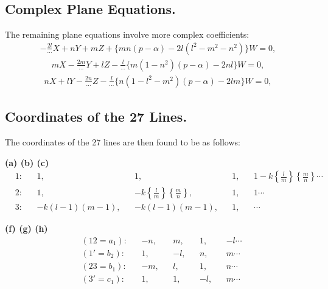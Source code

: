 \documentclass[11pt,a4paper]{article}
\begin{document}
\subsection*{Complex Plane Equations.}

The remaining plane equations involve more complex coefficients:
\begin{multline*}
-\frac{2l}{\cdots}X + nY + mZ + \{mn(p-\alpha) - 2l(l^2 - m^2 - n^2)\}W = 0,
\end{multline*}
\begin{equation*}
[36' = p_1]
\end{equation*}
\begin{multline*}
mX - \frac{2m}{\cdots}Y + lZ - \frac{l}{\cdots}\{m(1-n^2)(p-\alpha) - 2nl\}W = 0,
\end{multline*}
\begin{equation*}
[25' = q_1]
\end{equation*}
\begin{multline*}
nX + lY - \frac{2n}{\cdots}Z - \frac{l}{\cdots}\{n(1-l^2-m^2)(p-\alpha) - 2lm\}W = 0,
\end{multline*}
\begin{equation*}
[13.26.45 = r_1]
\end{equation*}

\subsection*{Coordinates of the 27 Lines.}

The coordinates of the 27 lines are then found to be as follows:

\textbf{(a) (b) (c)}
\begin{align*}
&1: && 1, && 1, && 1, && 1 - k\left\{\frac{l}{m}\right\}\left\{\frac{m}{n}\right\} \cdots \\
&2: && 1, && -k\left\{\frac{l}{m}\right\}\left\{\frac{m}{n}\right\}, && 1, && 1 \cdots \\
&3: && -k(l-1)(m-1), && -k(l-1)(m-1), && 1, && \cdots
\end{align*}

\textbf{(f) (g) (h)}
\begin{align*}
&(12 = a_1): && -n, && m, && 1, && -l \cdots \\
&(1' = b_2): && 1, && -l, && n, && m \cdots \\
&(23 = b_1): && -m, && l, && 1, && n \cdots \\
&(3' = c_1): && 1, && 1, && -l, && m \cdots
\end{align*}
\end{document}
